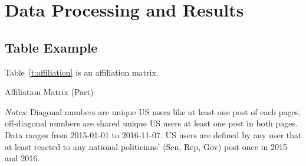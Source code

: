 \chapter{Data Processing and Results}
\label{c:data&result}

\section{Table Example}

Table~\ref{t:affiliation} is an affiliation matrix.

\begin{table}
\begin{center}
\begin{threeparttable}
\caption{Affiliation Matrix (Part)}
\label{t:affiliation}
\centering

\footnotesize 
{\it Notes}: 
Diagonal numbers are unique US users like at least one post of each pages, off-diagonal numbers are shared unique US users at least one post in both pages. 
Data ranges from 2015-01-01 to 2016-11-07. 
US users are defined by any user that at least reacted to any national politicians' (Sen, Rep, Gov) post once in 2015 and 2016.
\end{threeparttable}
\end{center}
\end{table}
\label{s:table}
